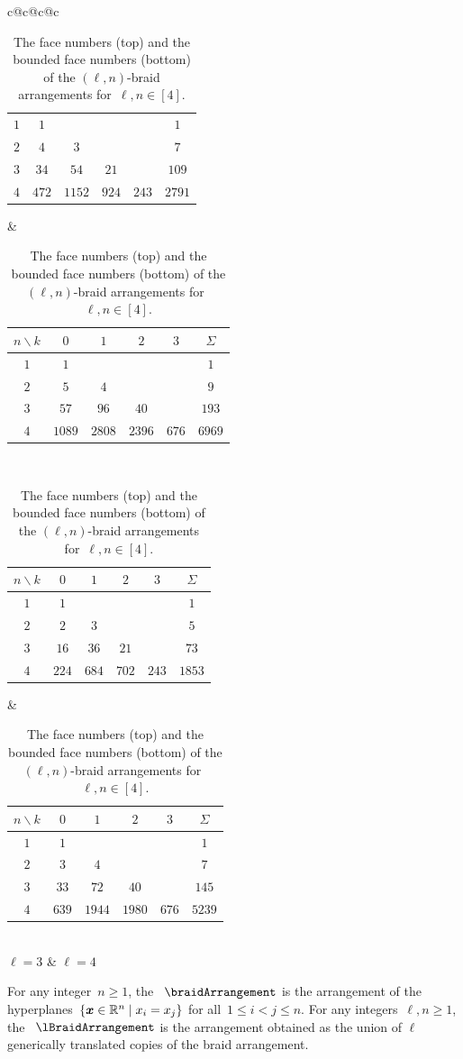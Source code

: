 \begin{table}
{\begin{tabular}{c@{\hspace{.7cm}}c@{\hspace{.7cm}}c@{\hspace{.7cm}}c}
\begin{tabular}[t]{c|cccc|c}
			$1$ & $1$ &&&& $1$ \\
			$2$ & $4$ & $3$ &&& $7$ \\
			$3$ & $34$ & $54$ & $21$ && $109$ \\
			$4$ & $472$ & $1152$ & $924$ & $243$ & $2791$
		\end{tabular}
		&
		\begin{tabular}[t]{c|cccc|c}
			$n \backslash k$ & $0$ & $1$ & $2$ & $3$ & $\Sigma$ \\
			\hline
			$1$ & $1$ &&&& $1$ \\
			$2$ & $5$ & $4$ &&& $9$ \\
			$3$ & $57$ & $96$ & $40$ && $193$ \\
			$4$ & $1089$ & $2808$ & $2396$ & $676$ & $6969$
		\end{tabular} \\[2cm]	
		\begin{tabular}[t]{c|cccc|c}
			$n \backslash k$ & $0$ & $1$ & $2$ & $3$ & $\Sigma$ \\
			\hline
			$1$ & $1$ &&&& $1$ \\
			$2$ & $2$ & $3$ &&& $5$ \\
			$3$ & $16$ & $36$ & $21$ && $73$ \\
			$4$ & $224$ & $684$ & $702$ & $243$ & $1853$
		\end{tabular}
		&
		\begin{tabular}[t]{c|cccc|c}
			$n \backslash k$ & $0$ & $1$ & $2$ & $3$ & $\Sigma$ \\
			\hline
			$1$ & $1$ &&&& $1$ \\
			$2$ & $3$ & $4$ &&& $7$ \\
			$3$ & $33$ & $72$ & $40$ && $145$ \\
			$4$ & $639$ & $1944$ & $1980$ & $676$ & $5239$
		\end{tabular}
		\\[2cm]	
		 $\ell = 3$ & $\ell = 4$
	\end{tabular}
	}
	\vspace{.3cm}
	\caption{The face numbers (top) and the bounded face numbers (bottom) of the $(\ell,n)$-braid arrangements for~$\ell, n \in [4]$.}
	\label{table:fvectorlBraidArrangements}
\end{table}

 

\begin{definition}
For any integer~$n \geq 1$, the ~$\braidArrangement$ is the arrangement of the hyperplanes~$\left\{ \boldsymbol{x} \in \mathbb R^n \;\middle|\; x_i = x_j \right\}$ for all~$1 \le i < j \le n$.
For any integers~$\ell,n \geq 1$, the ~$\lBraidArrangement$ is the arrangement obtained as the union of $\ell$ generically translated copies of the braid arrangement.
\end{definition}

